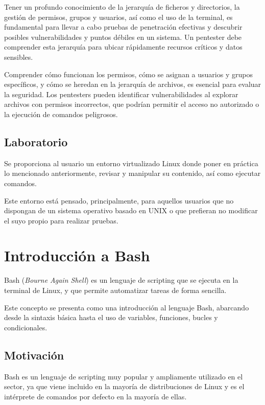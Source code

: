             Tener un profundo conocimiento de la jerarquía de ficheros y directorios, la gestión de permisos, grupos y usuarios, así como el uso de la terminal, es fundamental para llevar a cabo pruebas de penetración efectivas y descubrir posibles vulnerabilidades y puntos débiles en un sistema. Un pentester debe comprender esta jerarquía para ubicar rápidamente recursos críticos y datos sensibles.

            Comprender cómo funcionan los permisos, cómo se asignan a usuarios y grupos específicos, y cómo se heredan en la jerarquía de archivos, es esencial para evaluar la seguridad. Los pentesters pueden identificar vulnerabilidades al explorar archivos con permisos incorrectos, que podrían permitir el acceso no autorizado o la ejecución de comandos peligrosos.

        \subsection{Laboratorio}

            Se proporciona al usuario un entorno virtualizado Linux donde poner en práctica lo mencionado anteriormente, revisar y manipular su contenido, así como ejecutar comandos.

            Este entorno está pensado, principalmente, para aquellos usuarios que no dispongan de un sistema operativo basado en UNIX o que prefieran no modificar el suyo propio para realizar pruebas.

    
    \section{Introducción a Bash}

        Bash (\textit{Bourne Again Shell}) es un lenguaje de scripting que se ejecuta en la terminal de Linux, y que permite automatizar tareas de forma sencilla.

        Este concepto se presenta como una introducción al lenguaje Bash, abarcando desde la sintaxis básica hasta el uso de variables, funciones, bucles y condicionales.

        \subsection{Motivación}

            Bash es un lenguaje de scripting muy popular y ampliamente utilizado en el sector, ya que viene incluido en la mayoría de distribuciones de Linux y es el intérprete de comandos por defecto en la mayoría de ellas.
                        
